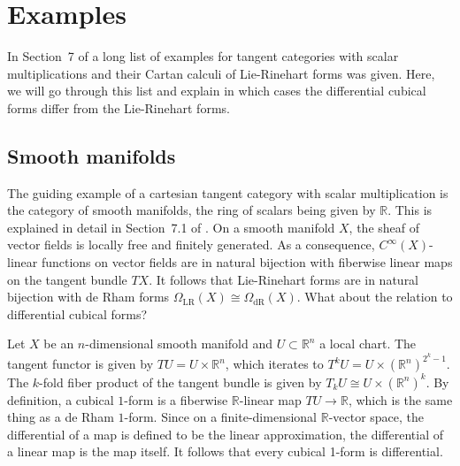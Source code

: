\documentclass[12pt,reqno, a4paper]{amsart}
\numberwithin{equation}{section}
\theoremstyle{plain}
\theoremstyle{definition}
\theoremstyle{remark}
\newcommand{\bbR}{\mathbb{R}}
\begin{document}
\section{Examples}

\label{sec:Examples}

In Section~7 of \cite{AintablianBlohmann:2026} a long list of examples for tangent categories with scalar multiplications and their Cartan calculi of Lie-Rinehart forms was given. Here, we will go through this list and explain in which cases the differential cubical forms differ from the Lie-Rinehart forms.



\subsection{Smooth manifolds}
\label{sec:SmoothMflds}

The guiding example of a cartesian tangent category with scalar multiplication is the category of smooth manifolds, the ring of scalars being given by $\bbR$. This is explained in detail in Section~7.1 of \cite{AintablianBlohmann:2026}. On a smooth manifold $X$, the sheaf of vector fields is locally free and finitely generated. As a consequence, $C^\infty(X)$-linear functions on vector fields are in natural bijection with fiberwise linear maps on the tangent bundle $TX$. It follows that Lie-Rinehart forms are in natural bijection with de Rham forms $\Omega_\mathrm{LR}(X) \cong \Omega_\mathrm{dR}(X)$. What about the relation to differential cubical forms?

Let $X$ be an $n$-dimensional smooth manifold and $U \subset \bbR^n$ a local chart. The tangent functor is given by $TU = U \times \bbR^n$, which iterates to $T^k U = U \times (\bbR^n)^{2^k-1}$. The $k$-fold fiber product of the tangent bundle is given by $T_k U \cong U \times (\bbR^n)^k$. By definition, a cubical $1$-form is a fiberwise $\bbR$-linear map $TU \to \bbR$, which is the same thing as a de Rham $1$-form. Since on a finite-dimensional $\bbR$-vector space, the differential of a map is defined to be the linear approximation, the differential of a linear map is the map itself. It follows that every cubical 1-form is differential.
\end{document}
